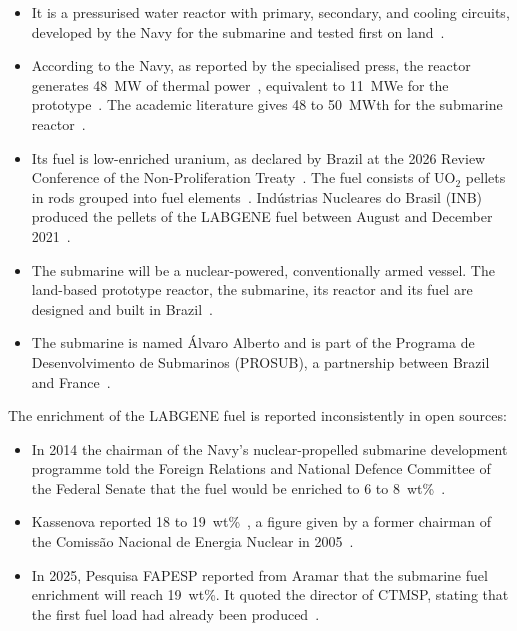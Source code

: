 \begin{itemize}
  \item It is a pressurised water reactor with primary, secondary, and
        cooling circuits, developed by the Navy for the submarine and
        tested first on land~\cite{ctmsp_labgene_2015}.

  \item According to the Navy, as reported by the specialised press, the
        reactor generates 48~MW of thermal
        power~\cite{demartini_nuclep_2022}, equivalent to 11~MWe for the
        prototype~\cite{galante_podernaval_2020}. The academic literature
        gives 48 to 50~MWth for the submarine
        reactor~\cite{dinizcosta_2017}.

  \item Its fuel is low-enriched uranium, as declared by Brazil at the
        2026 Review Conference of the Non-Proliferation
        Treaty~\cite{brazil_npt_wp13_2026}. The fuel consists of UO$_2$
        pellets in rods grouped into fuel
        elements~\cite{marinha_inb_labgene_2022,pereira_rmb_2023}.
        Indústrias Nucleares do Brasil (INB) produced the pellets of
        the LABGENE fuel between August and December
        2021~\cite{marinha_inb_labgene_2022}.

  \item The submarine will be a nuclear-powered, conventionally armed
        vessel. The land-based prototype reactor, the submarine, its
        reactor and its fuel are designed and built in
        Brazil~\cite{brazil_npt_wp13_2026}.

  \item The submarine is named Álvaro Alberto and is part of the
        Programa de Desenvolvimento de Submarinos (PROSUB), a partnership
        between Brazil and France~\cite{vasconcelos_fapesp_2025}.
\end{itemize}

The enrichment of the LABGENE fuel is reported inconsistently in open
sources:

\begin{itemize}
  \item In 2014 the chairman of the Navy's nuclear-propelled submarine
        development programme told the Foreign Relations and National
        Defence Committee of the Federal Senate that the fuel would be
        enriched to 6 to 8~wt\%~\cite{dinizcosta_2017}.

  \item Kassenova reported 18 to 19~wt\%~\cite{kassenova_2014}, a figure
        given by a former chairman of the Comissão Nacional de Energia
        Nuclear in 2005~\cite{dinizcosta_2017}.

  \item In 2025, Pesquisa FAPESP reported from Aramar that the submarine
        fuel enrichment will reach 19~wt\%. It quoted the director of
        CTMSP, stating that the first fuel load had already been
        produced~\cite{vasconcelos_fapesp_2025}.
\end{itemize}

